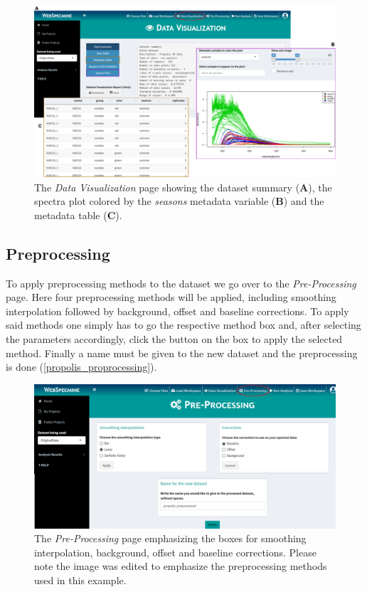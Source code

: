 \begin{figure}[h]
	\centering
	\includegraphics[width=1\linewidth]{Imagens/Propolis/data_overview}
	\caption{The \textit{Data Visualization} page showing the dataset summary (\textbf{A}), the spectra plot colored by the \textit{seasons} metadata variable (\textbf{B}) and the metadata table (\textbf{C}).}
	\label{propolis_data_overview}
\end{figure}


\subsection{Preprocessing}

To apply preprocessing methods to the dataset we go over to the \textit{Pre-Processing} page. Here four preprocessing methods will be applied, including smoothing interpolation followed by background, offset and baseline corrections. To apply said methods one simply has to go the respective method box and, after selecting the parameters accordingly, click the button on the box to apply the selected method. Finally a name must be given to the new dataset and the preprocessing is done (\autoref{propolis_proprocessing}).

\begin{figure}[h]
	\centering
	\includegraphics[width=0.8\linewidth]{Imagens/Propolis/proprocessing}
	\caption{The \textit{Pre-Processing} page emphasizing the boxes for smoothing interpolation, background, offset and baseline corrections. Please note the image was edited to emphasize the preprocessing methods used in this example.}
	\label{propolis_proprocessing}
\end{figure}


